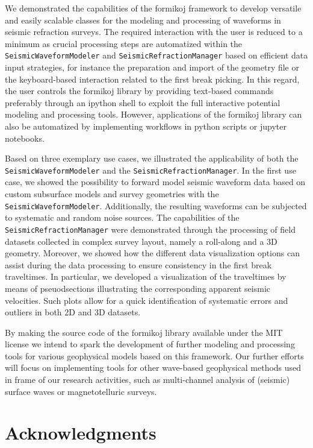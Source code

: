 \documentclass[a4paper,fleqn]{cas-sc}
\begin{document}
We demonstrated the capabilities of the formikoj framework to develop versatile and easily scalable classes for the modeling and processing of waveforms in seismic refraction surveys. The required interaction with the user is reduced to a minimum as crucial processing steps are automatized within the \texttt{SeismicWaveformModeler} and \texttt{SeismicRefractionManager} based on efficient data input strategies, for instance the preparation and import of the geometry file or the keyboard-based interaction related to the first break picking. In this regard, the user controls the formikoj library by providing text-based commands preferably through an ipython shell to exploit the full interactive potential modeling and processing tools. However, applications of the formikoj library can also be automatized by implementing workflows in python scripts or jupyter notebooks.

Based on three exemplary use cases, we illustrated the applicability of both the \texttt{SeismicWaveformModeler} and the \texttt{SeismicRefractionManager}. In the first use case, we showed the possibility to forward model seismic waveform data based on custom subsurface models and survey geometries with the \texttt{SeismicWaveformModeler}. Additionally, the resulting waveforms can be subjected to systematic and random noise sources. 
The capabilities of the \texttt{SeismicRefractionManager} were demonstrated through the processing of field datasets collected in complex survey layout, namely a roll-along and a 3D geometry. 
Moreover, we showed how the different data visualization options can assist during the data processing to ensure consistency in the first break traveltimes. In particular, we developed a visualization of the traveltimes by means of pseuodsections illustrating the corresponding apparent seismic velocities. Such plots allow for a quick identification of systematic errors and outliers in both 2D and 3D datasets.

By making the source code of the formikoj library available under the MIT license we intend to spark the development of further modeling and processing tools for various geophysical models based on this framework. Our further efforts will focus on implementing tools for other wave-based geophysical methods used in frame of our research activities, such as multi-channel analysis of (seismic) surface waves or magnetotelluric surveys. 

\section{Acknowledgments}
\end{document}
